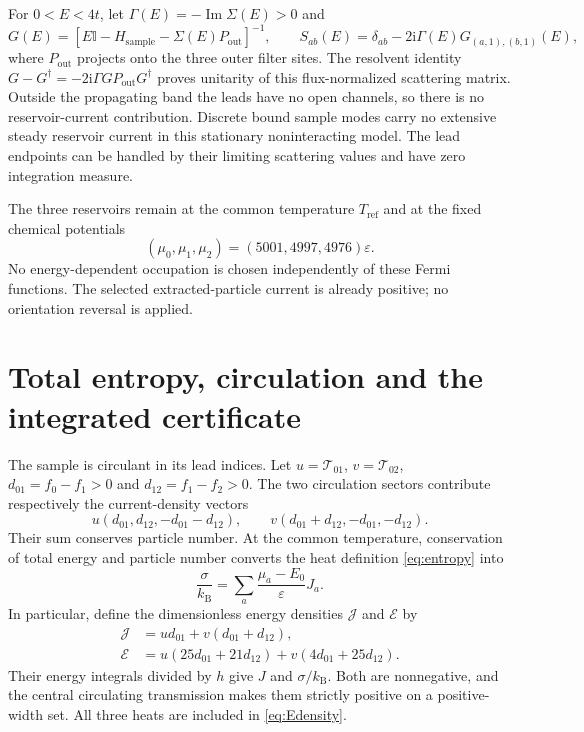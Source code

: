 \documentclass[11pt,a4paper]{article}
\newcommand{\kb}{k_{\mathrm B}}
\newcommand{\ee}{\varepsilon}
\newcommand{\ii}{\mathrm i}
\begin{document}
For $0<E<4t$, let $\Gamma(E)=-\operatorname{Im}\Sigma(E)>0$ and
\begin{equation}
 G(E)=[E\mathbb I-H_{\mathrm{sample}}-\Sigma(E)P_{\mathrm{out}}]^{-1},
 \qquad S_{ab}(E)=\delta_{ab}-2\ii\Gamma(E)G_{(a,1),(b,1)}(E),
 \label{eq:S}
\end{equation}
where $P_{\mathrm{out}}$ projects onto the three outer filter sites.
The resolvent identity
$G-G^\dagger=-2\ii\Gamma G P_{\mathrm{out}}G^\dagger$ proves unitarity
of this flux-normalized scattering matrix. Outside the propagating band the
leads have no open channels, so there is no reservoir-current contribution.
Discrete bound sample modes carry no extensive steady reservoir current in
this stationary noninteracting model. The lead endpoints can be handled by
their limiting scattering values and have zero integration measure.

The three reservoirs remain at the common temperature $T_{\mathrm{ref}}$
and at the fixed chemical potentials
\begin{equation}
 (\mu_0,\mu_1,\mu_2)=(5001,4997,4976)\ee.
 \label{eq:reservoirs}
\end{equation}
No energy-dependent occupation is chosen independently of these Fermi
functions. The selected extracted-particle current is already positive;
no orientation reversal is applied.

\section{Total entropy, circulation and the integrated certificate}

The sample is circulant in its lead indices. Let
$u=\mathcal T_{01}$, $v=\mathcal T_{02}$,
$d_{01}=f_0-f_1>0$ and $d_{12}=f_1-f_2>0$. The two circulation sectors
contribute respectively the current-density vectors
\begin{equation}
 u(d_{01},d_{12},-d_{01}-d_{12}),\qquad
 v(d_{01}+d_{12},-d_{01},-d_{12}).
 \label{eq:cycles}
\end{equation}
Their sum conserves particle number. At the common temperature, conservation
of total energy and particle number converts the heat definition
\eqref{eq:entropy} into
\begin{equation}
 \frac{\sigma}{\kb}=\sum_a\frac{\mu_a-E_0}{\ee}J_a.
 \label{eq:commonT}
\end{equation}
In particular, define the dimensionless energy densities $\mathcal J$ and
$\mathcal E$ by
\begin{align}
 \mathcal J&=u d_{01}+v(d_{01}+d_{12}),\label{eq:Jdensity}\\
 \mathcal E&=u(25d_{01}+21d_{12})+v(4d_{01}+25d_{12}).
 \label{eq:Edensity}
\end{align}
Their energy integrals divided by $h$ give $J$ and $\sigma/\kb$.
Both are nonnegative, and the central circulating transmission makes them
strictly positive on a positive-width set. All three heats are included in
\eqref{eq:Edensity}.
\end{document}
